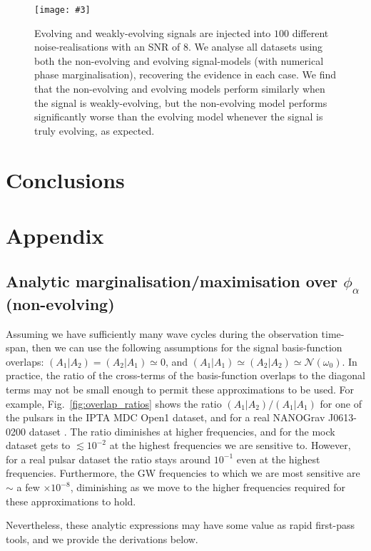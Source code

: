 \documentclass[prd,showpacs,nofootinbib]{revtex4}
\newcommand{\incgraph}[3]{\texttt{[image: \#3]}}
\begin{document}
\begin{figure*}
  \incgraph{0}{0.7}{Evolve_NonEvolve_TemplateCompare.png}
   \caption{\label{fig:EvNonEv_BayesDiff}Evolving and weakly-evolving signals are injected into $100$ different noise-realisations with an SNR of $8$. We analyse all datasets using both the non-evolving and evolving signal-models (with numerical phase marginalisation), recovering the evidence in each case. We find that the non-evolving and evolving models perform similarly when the signal is weakly-evolving, but the non-evolving model performs significantly worse than the evolving model whenever the signal is truly evolving, as expected.} 
 \end{figure*}

\section{Conclusions}


\section*{Appendix}
\appendix 

\subsection{Analytic marginalisation/maximisation over $\phi_\alpha$ (non-evolving)}
Assuming we have sufficiently many wave cycles during the observation time-span, then we can use the following assumptions for the signal basis-function overlaps: $(A_1|A_2)=(A_2|A_1)\simeq 0$, and $(A_1|A_1)\simeq(A_2|A_2)\simeq \mathcal{N}(\omega_0)$. In practice, the ratio of the cross-terms of the basis-function overlaps to the diagonal terms may not be small enough to permit these approximations to be used. For example, Fig.\ \ref{fig:overlap_ratios} shows the ratio $(A_1|A_2)/(A_1|A_1)$ for one of the pulsars in the IPTA MDC Open1 dataset, and for a real NANOGrav J0613-0200 dataset \citep{demorest2013}. The ratio diminishes at higher frequencies, and for the mock dataset gets to $\lesssim 10^{-2}$ at the highest frequencies we are sensitive to. However, for a real pulsar dataset the ratio stays around $10^{-1}$ even at the highest frequencies. Furthermore, the GW frequencies to which we are most sensitive are $\sim$ a few $\times 10^{-8}$, diminishing as we move to the higher frequencies required for these approximations to hold.

Nevertheless, these analytic expressions may have some value as rapid first-pass tools, and we provide the derivations below.
 
\end{document}
